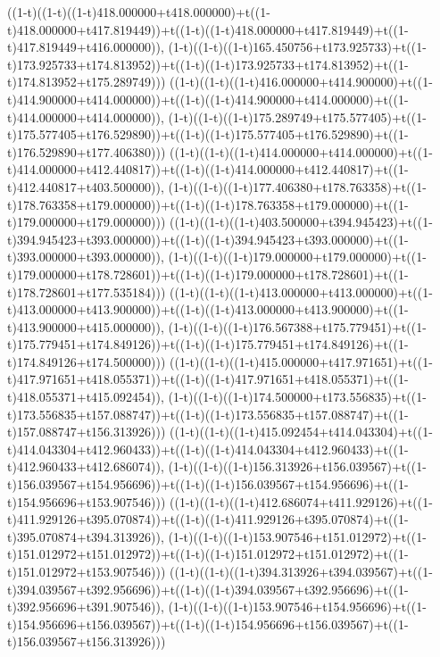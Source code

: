((1-t)((1-t)((1-t)418.000000+t418.000000)+t((1-t)418.000000+t417.819449))+t((1-t)((1-t)418.000000+t417.819449)+t((1-t)417.819449+t416.000000)),                                     (1-t)((1-t)((1-t)165.450756+t173.925733)+t((1-t)173.925733+t174.813952))+t((1-t)((1-t)173.925733+t174.813952)+t((1-t)174.813952+t175.289749)))
((1-t)((1-t)((1-t)416.000000+t414.900000)+t((1-t)414.900000+t414.000000))+t((1-t)((1-t)414.900000+t414.000000)+t((1-t)414.000000+t414.000000)),                                     (1-t)((1-t)((1-t)175.289749+t175.577405)+t((1-t)175.577405+t176.529890))+t((1-t)((1-t)175.577405+t176.529890)+t((1-t)176.529890+t177.406380)))
((1-t)((1-t)((1-t)414.000000+t414.000000)+t((1-t)414.000000+t412.440817))+t((1-t)((1-t)414.000000+t412.440817)+t((1-t)412.440817+t403.500000)),                                     (1-t)((1-t)((1-t)177.406380+t178.763358)+t((1-t)178.763358+t179.000000))+t((1-t)((1-t)178.763358+t179.000000)+t((1-t)179.000000+t179.000000)))
((1-t)((1-t)((1-t)403.500000+t394.945423)+t((1-t)394.945423+t393.000000))+t((1-t)((1-t)394.945423+t393.000000)+t((1-t)393.000000+t393.000000)),                                     (1-t)((1-t)((1-t)179.000000+t179.000000)+t((1-t)179.000000+t178.728601))+t((1-t)((1-t)179.000000+t178.728601)+t((1-t)178.728601+t177.535184)))
((1-t)((1-t)((1-t)413.000000+t413.000000)+t((1-t)413.000000+t413.900000))+t((1-t)((1-t)413.000000+t413.900000)+t((1-t)413.900000+t415.000000)),                                     (1-t)((1-t)((1-t)176.567388+t175.779451)+t((1-t)175.779451+t174.849126))+t((1-t)((1-t)175.779451+t174.849126)+t((1-t)174.849126+t174.500000)))
((1-t)((1-t)((1-t)415.000000+t417.971651)+t((1-t)417.971651+t418.055371))+t((1-t)((1-t)417.971651+t418.055371)+t((1-t)418.055371+t415.092454)),                                     (1-t)((1-t)((1-t)174.500000+t173.556835)+t((1-t)173.556835+t157.088747))+t((1-t)((1-t)173.556835+t157.088747)+t((1-t)157.088747+t156.313926)))
((1-t)((1-t)((1-t)415.092454+t414.043304)+t((1-t)414.043304+t412.960433))+t((1-t)((1-t)414.043304+t412.960433)+t((1-t)412.960433+t412.686074)),                                     (1-t)((1-t)((1-t)156.313926+t156.039567)+t((1-t)156.039567+t154.956696))+t((1-t)((1-t)156.039567+t154.956696)+t((1-t)154.956696+t153.907546)))
((1-t)((1-t)((1-t)412.686074+t411.929126)+t((1-t)411.929126+t395.070874))+t((1-t)((1-t)411.929126+t395.070874)+t((1-t)395.070874+t394.313926)),                                     (1-t)((1-t)((1-t)153.907546+t151.012972)+t((1-t)151.012972+t151.012972))+t((1-t)((1-t)151.012972+t151.012972)+t((1-t)151.012972+t153.907546)))
((1-t)((1-t)((1-t)394.313926+t394.039567)+t((1-t)394.039567+t392.956696))+t((1-t)((1-t)394.039567+t392.956696)+t((1-t)392.956696+t391.907546)),                                     (1-t)((1-t)((1-t)153.907546+t154.956696)+t((1-t)154.956696+t156.039567))+t((1-t)((1-t)154.956696+t156.039567)+t((1-t)156.039567+t156.313926)))
